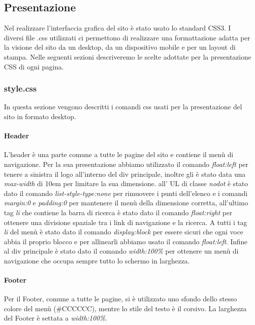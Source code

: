 \subsection{Presentazione}
Nel realizzare l'interfaccia grafica del sito è stato usato lo standard CSS3.\newline
I diversi file .css utilizzati ci permettono di realizzare una formattazione adatta per la visione del sito da un desktop, da un dispositivo mobile e per un layout di stampa. \newline 
Nelle seguenti sezioni descriveremo le scelte adottate per la presentazione CSS di ogni pagina.

\subsubsection{style.css}
In questa sezione vengono descritti i comandi css usati per la presentazione del sito in formato desktop.

\paragraph{Header} \Spazio
L'header è una parte comune a tutte le pagine del sito e contiene il menù di navigazione. \newline Per la sua presentazione abbiamo utilizzato il comando \emph{float:left} per tenere a sinistra il logo all'interno del div principale, inoltre gli è stato data una \emph{max-width} di 10em per limitare la sua dimensione. all' UL di classe \emph{nodot} è stato dato il comando \emph{list-style-type:none} per rimuovere i punti dell'elenco e i comandi \emph{margin:0} e \emph{padding:0} per mantenere il menù della dimensione corretta, all'ultimo tag \emph{li} che contiene la barra di ricerca è stato dato il comando \emph{float:right} per ottenere una divisione spaziale tra i link di navigazione e la ricerca.
A tutti i tag \emph{li} del menù è stato dato il comando \emph{display:block} per essere sicuri che ogni voce abbia il proprio blocco e per allinearli abbiamo usato il comando \emph{float:left}.
Infine al div principale è stato dato il comando \emph{width:100\%} per ottenere un menù di navigazione che occupa sempre tutto lo schermo in larghezza.

\paragraph{Footer} \Spazio
Per il Footer, comune a tutte le pagine, si è utilizzato uno sfondo dello stesso colore del menù (\#CCCCCC), mentre lo stile del testo è il corsivo. La larghezza del Footer è settata a \emph{width:100\%}.


